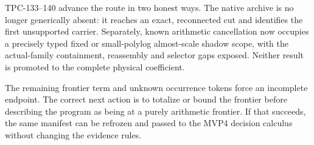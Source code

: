 \documentclass[11pt]{article}
\theoremstyle{definition}
\theoremstyle{remark}
\begin{document}
TPC-133--140 advance the route in two honest ways.  The native
archive is no longer generically absent: it reaches an exact,
reconnected cut and identifies the first unsupported carrier.
Separately, known arithmetic cancellation now occupies a precisely
typed fixed or small-polylog almost-scale shadow scope, with the
actual-family containment, reassembly and selector gaps exposed.
Neither result is promoted to the complete physical coefficient.

The remaining frontier term and unknown occurrence tokens force an
incomplete endpoint.  The correct next action is to totalize or bound
the frontier before describing the program as being at a purely
arithmetic frontier.  If that succeeds, the same manifest can be
refrozen and passed to the MVP4 decision calculus without changing
the evidence rules.

\begingroup
\small
\setlength{\bibsep}{2pt plus 0.3ex}
\sloppy


\endgroup
\end{document}
